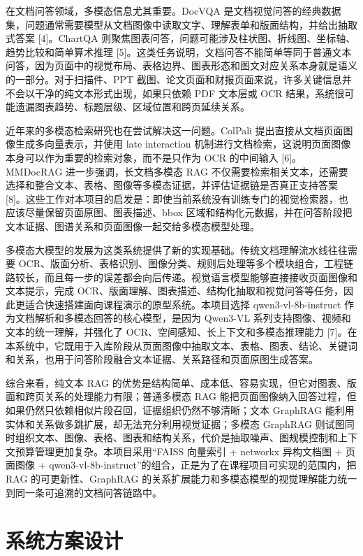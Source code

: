 在文档问答领域，多模态信息尤其重要。DocVQA
是文档视觉问答的经典数据集，问题通常需要模型从文档图像中读取文字、理解表单和版面结构，并给出抽取式答案
{[}4{]}。ChartQA
则聚焦图表问答，问题可能涉及柱状图、折线图、坐标轴、趋势比较和简单算术推理
{[}5{]}。这类任务说明，文档问答不能简单等同于普通文本问答，因为页面中的视觉布局、表格边界、图表形态和图文对应关系本身就是语义的一部分。对于扫描件、PPT
截图、论文页面和财报页面来说，许多关键信息并不会以干净的纯文本形式出现，如果只依赖
PDF 文本层或 OCR
结果，系统很可能遗漏图表趋势、标题层级、区域位置和跨页延续关系。

近年来的多模态检索研究也在尝试解决这一问题。ColPali
提出直接从文档页面图像生成多向量表示，并使用 late interaction
机制进行文档检索，这说明页面图像本身可以作为重要的检索对象，而不是只作为
OCR 的中间输入 {[}6{]}。MMDocRAG 进一步强调，长文档多模态 RAG
不仅需要检索相关文本，还需要选择和整合文本、表格、图像等多模态证据，并评估证据链是否真正支持答案
{[}8{]}。这些工作对本项目的启发是：即使当前系统没有训练专门的视觉检索器，也应该尽量保留页面原图、图表描述、bbox
区域和结构化元数据，并在问答阶段把文本证据、图谱关系和页面图像一起交给多模态模型处理。

多模态大模型的发展为这类系统提供了新的实现基础。传统文档理解流水线往往需要
OCR、版面分析、表格识别、图像分类、规则后处理等多个模块组合，工程链路较长，而且每一步的误差都会向后传递。视觉语言模型能够直接接收页面图像和文本提示，完成
OCR、版面理解、图表描述、结构化抽取和视觉问答等任务，因此更适合快速搭建面向课程演示的原型系统。本项目选择
qwen3-vl-8b-instruct 作为文档解析和多模态回答的核心模型，是因为 Qwen3-VL
系列支持图像、视频和文本的统一理解，并强化了
OCR、空间感知、长上下文和多模态推理能力
{[}7{]}。在本系统中，它既用于入库阶段从页面图像中抽取文本、表格、图表、结论、关键词和关系，也用于问答阶段融合文本证据、关系路径和页面原图生成答案。

综合来看，纯文本 RAG
的优势是结构简单、成本低、容易实现，但它对图表、版面和跨页关系的处理能力有限；普通多模态
RAG
能把页面图像纳入回答过程，但如果仍然只依赖相似片段召回，证据组织仍然不够清晰；文本
GraphRAG 能利用实体和关系做多跳扩展，却无法充分利用视觉证据；多模态
GraphRAG
则试图同时组织文本、图像、表格、图表和结构关系，代价是抽取噪声、图规模控制和上下文预算管理更加复杂。本项目采用``FAISS
向量索引 + networkx 异构文档图 + 页面图像 +
qwen3-vl-8b-instruct''的组合，正是为了在课程项目可实现的范围内，把 RAG
的可更新性、GraphRAG
的关系扩展能力和多模态模型的视觉理解能力统一到同一条可追溯的文档问答链路中。

\chapter{系统方案设计}\label{ux4e09ux7cfbux7edfux65b9ux6848ux8bbeux8ba1}

